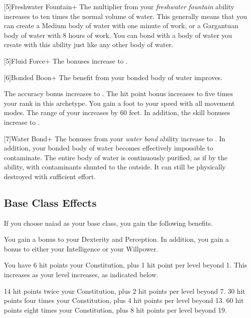     [5]{Freshwater Fountain+} The multiplier from your \textit{freshwater fountain} ability increases to ten times the normal volume of water.
    This generally means that you can create a Medium body of water with one minute of work, or a Gargantuan body of water with 8 hours of work.
    You can bond with a body of water you create with this ability just like any other body of water.

    [5]{Fluid Force+} The bonuses increase to .

    [6]{Bonded Boon+} The benefit from your bonded body of water improves.
    \begin{raggeditemize}
       The accuracy bonus increases to .
       The hit point bonus increases to five times your rank in this archetype.
       You gain a  foot  to your speed with all movement modes.
       The range of your  increases by 60 feet.
        In addition, the skill bonuses increase to .
    \end{raggeditemize}

    [7]{Water Bond+} The bonuses from your \textit{water bond} ability increase to .
    In addition, your bonded body of water becomes effectively impossible to contaminate.
    The entire body of water is continuously purified, as if by the  ability, with contaminants shunted to the outside.
    It can still be physically destroyed with sufficient effort.

  \subsection{Base Class Effects}
    If you choose naiad as your base class, you gain the following benefits.

      You gain a  bonus to your Dexterity and Perception. In addition, you gain a  bonus to either your Intelligence or your Willpower.

      You have 6 hit points \add your Constitution, plus 1 hit point per level beyond 1.
      This increases as your level increases, as indicated below.
      \begin{itemize}
         14 hit points \add twice your Constitution, plus 2 hit points per level beyond 7.
         30 hit points \add four times your Constitution, plus 4 hit points per level beyond 13.
         60 hit points \add eight times your Constitution, plus 8 hit points per level beyond 19.
      \end{itemize}


